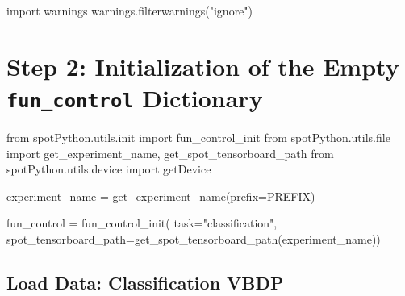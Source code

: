 \documentclass[
  letterpaper,
  DIV=11,
  numbers=noendperiod]{scrreprt}
\newenvironment{Shaded}{\begin{snugshade}}{\end{snugshade}}
\newcommand{\BuiltInTok}[1]{\textcolor[rgb]{0.00,0.23,0.31}{#1}}
\newcommand{\ImportTok}[1]{\textcolor[rgb]{0.00,0.46,0.62}{#1}}
\newcommand{\NormalTok}[1]{\textcolor[rgb]{0.00,0.23,0.31}{#1}}
\newcommand{\OperatorTok}[1]{\textcolor[rgb]{0.37,0.37,0.37}{#1}}
\newcommand{\StringTok}[1]{\textcolor[rgb]{0.13,0.47,0.30}{#1}}
\begin{document}
\begin{Shaded}
\begin{Highlighting}[]
\ImportTok{import}\NormalTok{ warnings}
\NormalTok{warnings.filterwarnings(}\StringTok{"ignore"}\NormalTok{)}
\end{Highlighting}
\end{Shaded}

\hypertarget{step-2-initialization-of-the-empty-fun_control-dictionary-4}{%
\section{\texorpdfstring{Step 2: Initialization of the Empty
\texttt{fun\_control}
Dictionary}{Step 2: Initialization of the Empty fun\_control Dictionary}}\label{step-2-initialization-of-the-empty-fun_control-dictionary-4}}

\begin{Shaded}
\begin{Highlighting}[]
\ImportTok{from}\NormalTok{ spotPython.utils.init }\ImportTok{import}\NormalTok{ fun\_control\_init}
\ImportTok{from}\NormalTok{ spotPython.utils.}\BuiltInTok{file} \ImportTok{import}\NormalTok{ get\_experiment\_name, get\_spot\_tensorboard\_path}
\ImportTok{from}\NormalTok{ spotPython.utils.device }\ImportTok{import}\NormalTok{ getDevice}

\NormalTok{experiment\_name }\OperatorTok{=}\NormalTok{ get\_experiment\_name(prefix}\OperatorTok{=}\NormalTok{PREFIX)}

\NormalTok{fun\_control }\OperatorTok{=}\NormalTok{ fun\_control\_init(}
\NormalTok{    task}\OperatorTok{=}\StringTok{"classification"}\NormalTok{,}
\NormalTok{    spot\_tensorboard\_path}\OperatorTok{=}\NormalTok{get\_spot\_tensorboard\_path(experiment\_name))}
\end{Highlighting}
\end{Shaded}

\hypertarget{load-data-classification-vbdp-3}{%
\subsection{Load Data: Classification
VBDP}\label{load-data-classification-vbdp-3}}
\end{document}
